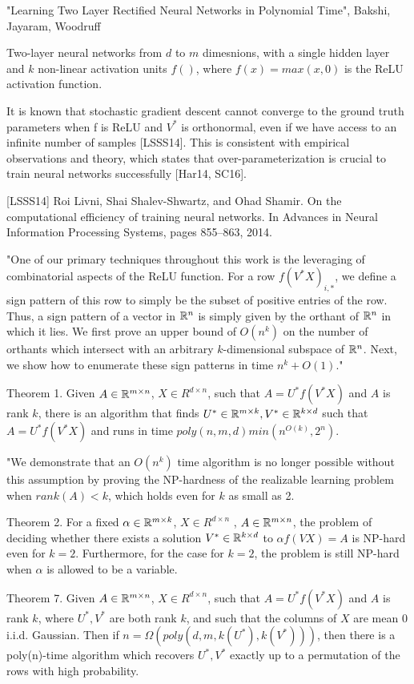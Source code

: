 \documentclass[english]{article}
\begin{document}
\item "Learning Two Layer Rectified Neural Networks in Polynomial Time", Bakshi, Jayaram, Woodruff 

Two-layer neural networks from $d$ to $m$ dimesnions, with a single  hidden layer and $k$ non-linear activation units $f()$, where $f(x) = max(x,0)$ is the ReLU activation function.

It is known that stochastic gradient descent cannot converge to the ground truth parameters when f is ReLU and $V^*$ is orthonormal, even if we have access to an infinite number of samples [LSSS14]. This is consistent with empirical observations and theory, which states that
over-parameterization is crucial to train neural networks successfully [Har14, SC16].

[LSSS14] Roi Livni, Shai Shalev-Shwartz, and Ohad Shamir. On the computational efficiency
of training neural networks. In Advances in Neural Information Processing Systems,
pages 855–863, 2014.

"One of our
primary techniques throughout this work is the leveraging of combinatorial aspects of the ReLU
function. For a row $f(V^* X)_{i,*}$, we define a sign pattern of this row to simply be the subset of
positive entries of the row. Thus, a sign pattern of a vector in $\mathbb{R}^n$ is simply given by the orthant
of $\mathbb{R}^n$ in which it lies. We first prove an upper bound of $O(n^k)$ on the number of orthants which
intersect with an arbitrary $k$-dimensional subspace of $\mathbb{R}^n$. Next, we show how to enumerate these
sign patterns in time $n^k+O(1)$."

Theorem 1. Given $A \in \mathbb{R}^{m\times n}$, $X \in R^{d\times n}$, such that $A = U^* f(V^* X)$ and $A$ is rank $k$, there
is an algorithm that finds $U^* \in \mathbb{R}^{m\times k} ,V^* \in \mathbb{R}^{k\times d}$ such that $A = U^* f(V^* X)$ and runs in time $
poly(n,m,d) min(n^{O(k)} ,2^n)$.

"We demonstrate that an $O(n^k)$ time algorithm is no longer
possible without this assumption by proving the NP-hardness of the realizable learning problem when $rank(A) < k$, which holds even for $k$ as small as 2. 


Theorem 2. For a fixed $\alpha \in \mathbb{R}^{m\times k}$, $X \in R^{d\times n}$ , $A \in \mathbb{R}^{m\times n}$, the problem of deciding whether there
exists a solution $V^* \in \mathbb{R}^{k\times d}$ to $\alpha f(VX) = A$ is NP-hard even for $k = 2$. Furthermore, for the case
for $k = 2$, the problem is still NP-hard when $\alpha$ is allowed to be a variable.

Theorem 7. Given $A \in \mathbb{R}^{m\times n}$, $X \in R^{d\times n}$, such that $A = U^* f(V^* X)$ and $A$ is rank $k$, where $U^*,V^*$ are both rank $k$, and such
that the columns of $X$ are mean 0 i.i.d. Gaussian. Then if $n = \Omega(poly(d,m,k(U^*),k(V^*)))$,
then there is a poly(n)-time algorithm which recovers $U^*,V^*$ exactly up to a permutation of the
rows with high probability.
\end{document}
